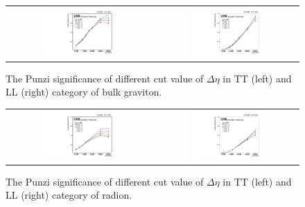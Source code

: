 \begin{figure}[t]
  \centering
  \begin{tabular}{cc}
    \includegraphics[width=0.5\textwidth]{Figures/deta/bulk/dEtaTT.pdf} &
       \includegraphics[width=0.5\textwidth]{Figures/deta/bulk/dEtaLL.pdf}
  \end{tabular}
  \caption{The Punzi significance of different cut value of $\Delta \eta$ in TT (left) and LL (right) category of bulk graviton.}

\end{figure}

\begin{figure}[t]
  \centering
  \begin{tabular}{cc}
    \includegraphics[width=0.5\textwidth]{Figures/deta/rad/dEtaTT.pdf} &
       \includegraphics[width=0.5\textwidth]{Figures/deta/rad/dEtaLL.pdf}
  \end{tabular}
  \caption{The Punzi significance of different cut value of $\Delta \eta$ in TT (left) and LL (right) category of radion.}

\end{figure}

